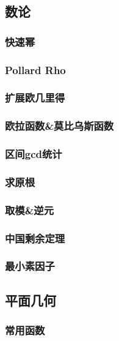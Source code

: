 \subsection{数论}
\subsubsection{快速幂}

\subsubsection{Pollard Rho}

\subsubsection{扩展欧几里得}

\subsubsection{欧拉函数\&莫比乌斯函数}

\subsubsection{区间gcd统计}

\subsubsection{求原根}

\subsubsection{取模\&逆元}

\subsubsection{中国剩余定理}

\subsubsection{最小素因子}


\subsection{平面几何}
\subsubsection{常用函数}

